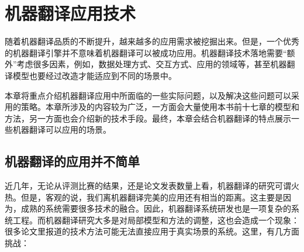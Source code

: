 
%


\renewcommand\figurename{图}%
\renewcommand\tablename{表}%


\chapter{机器翻译应用技术}

\parinterval 随着机器翻译品质的不断提升，越来越多的应用需求被挖掘出来。但是，一个优秀的机器翻译引擎并不意味着机器翻译可以被成功应用。机器翻译技术落地需要“额外”考虑很多因素，例如，数据处理方式、交互方式、应用的领域等，甚至机器翻译模型也要经过改造才能适应到不同的场景中。

\parinterval 本章将重点介绍机器翻译应用中所面临的一些实际问题，以及解决这些问题可以采用的策略。本章所涉及的内容较为广泛，一方面会大量使用本书前十七章的模型和方法，另一方面也会介绍新的技术手段。最终，本章会结合机器翻译的特点展示一些机器翻译可以应用的场景。


\section{机器翻译的应用并不简单}

\parinterval 近几年，无论从评测比赛的结果，还是论文发表数量上看，机器翻译的研究可谓火热。但是，客观的说，我们离机器翻译完美的应用还有相当的距离。这主要是因为，成熟的系统需要很多技术的融合。因此，机器翻译系统研发也是一项复杂的系统工程。而机器翻译研究大多是对局部模型和方法的调整，这也会造成一个现象：很多论文里报道的技术方法可能无法直接应用于真实场景的系统。这里，有几方面挑战：

